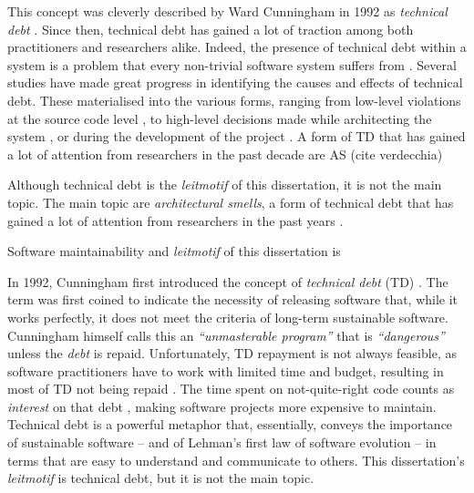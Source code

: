 This concept was cleverly described by Ward Cunningham in 1992 as \emph{technical debt} \cite{Cunningham1992}.
Since then, technical debt has gained a lot of traction among both practitioners and researchers alike.
Indeed, the presence of technical debt within a system is a problem that every non-trivial software system suffers from \cite{Brown2010,Kruchten2012,Lehman1979}.
Several studies have made great progress in identifying the causes and effects of technical debt.
These materialised into the various forms, ranging from low-level violations at the source code level \cite{Letouzey2012,Curtis2012}, to high-level decisions made while architecting the system \cite{Ernst2015}, or during the development of the project \cite{Yli-Huumo2014}. 
A form of TD that has gained a lot of attention from researchers in the past decade are AS (cite verdecchia)
%

Although technical debt is the \emph{leitmotif} of this dissertation, it is not the main topic. 
The main topic are \emph{architectural smells}, a form of technical debt that has gained a lot of attention from researchers in the past years \cite{Verdecchia2018}.
 

Software maintainability and  \emph{leitmotif} of this dissertation is 

In 1992, Cunningham first introduced the concept of \emph{technical debt} (TD) \cite{Cunningham1992}. 
The term was first coined to indicate the necessity of releasing software that, while it works perfectly, it does not meet the criteria of long-term sustainable software. 
Cunningham himself calls this an \emph{``unmasterable program''} that is \emph{``dangerous''} unless the \emph{debt} is repaid.
Unfortunately, TD repayment is not always feasible, as software practitioners have to work with limited time and budget, resulting in most of TD not being repaid \cite{Digkas2018}.
The time spent on not-quite-right code counts as \emph{interest} on that debt \cite{Cunningham1992}, making software projects more expensive to maintain.
Technical debt is a powerful metaphor that, essentially, conveys the importance of sustainable software -- and of Lehman's first law of software evolution -- in terms that are easy to understand and communicate to others. 
This dissertation's \emph{leitmotif} is technical debt, but it is not the main topic.





